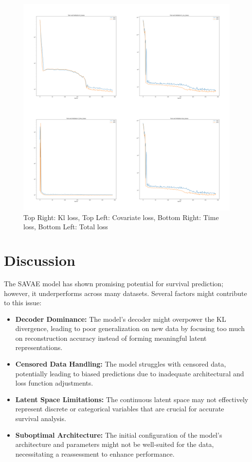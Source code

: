 \documentclass{article}
\begin{document}
\begin{figure}[H]
    \centering
    \includegraphics[width=13cm]{figures/loss.png}
    \caption{Top Right: Kl loss, Top Left: Covariate loss, Bottom Right: Time loss, Bottom Left: Total loss }
    \label{loss}

\end{figure}


\section{Discussion}
The SAVAE model has shown promising potential for survival prediction; however, it underperforms across many datasets. Several factors might contribute to this issue:

\begin{itemize}
    \item \textbf{Decoder Dominance:} The model's decoder might overpower the KL divergence, leading to poor generalization on new data by focusing too much on reconstruction accuracy instead of forming meaningful latent representations.
    \item \textbf{Censored Data Handling:} The model struggles with censored data, potentially leading to biased predictions due to inadequate architectural and loss function adjustments.
    \item \textbf{Latent Space Limitations:} The continuous latent space may not effectively represent discrete or categorical variables that are crucial for accurate survival analysis.
    \item \textbf{Suboptimal Architecture:} The initial configuration of the model's architecture and parameters might not be well-suited for the data, necessitating a reassessment to enhance performance.
\end{itemize}
\end{document}
